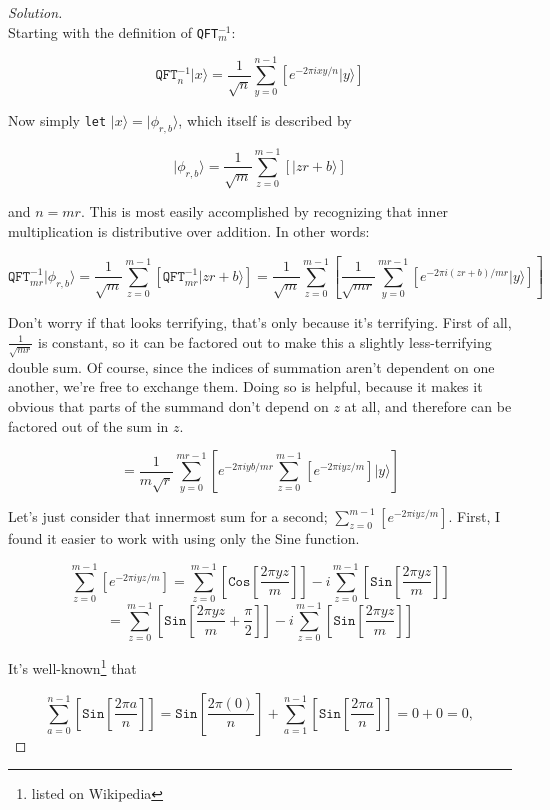 \documentclass[12pt]{article}
\begin{document}
\begin{proof}[Solution]~\\
Starting with the definition of \texttt{QFT}$^{-1}_m$:

$$\texttt{QFT}^{-1}_n|x\rangle=\frac{1}{\sqrt{n}}\sum_{y=0}^{n-1}\left[e^{-2\pi ixy/n}|y\rangle\right]$$

Now simply \texttt{let} $|x\rangle=|\phi_{r,b}\rangle$, which itself is described by

$$|\phi_{r,b}\rangle=\frac{1}{\sqrt{m}}\sum_{z=0}^{m-1}\left[|zr+b\rangle\right]$$

and $n=mr$. This is most easily accomplished by recognizing that inner multiplication is distributive over addition. In other words:

$$\texttt{QFT}_{mr}^{-1}|\phi_{r,b}\rangle=\frac{1}{\sqrt{m}}\sum_{z=0}^{m-1}\left[\texttt{QFT}_{mr}^{-1}|zr+b\rangle\right]=\frac{1}{\sqrt{m}}\sum_{z=0}^{m-1}\left[\frac{1}{\sqrt{mr}}\sum_{y=0}^{mr-1}\left[e^{-2\pi i(zr+b)/mr}|y\rangle\right]\right]$$

Don't worry if that looks terrifying, that's only because it's terrifying. First of all, $\frac{1}{\sqrt{mr}}$ is constant, so it can be factored out to make this a slightly less-terrifying double sum. Of course, since the indices of summation aren't dependent on one another, we're free to exchange them. Doing so is helpful, because it makes it obvious that parts of the summand don't depend on $z$ at all, and therefore can be factored out of the sum in $z$.

$$=\frac{1}{m\sqrt{r}}\sum_{y=0}^{mr-1}\left[e^{-2\pi iyb/mr}\sum_{z=0}^{m-1}\left[e^{-2\pi iyz/m}\right]|y\rangle\right]$$

Let's just consider that innermost sum for a second; $\sum_{z=0}^{m-1}[e^{-2\pi iyz/m}]$. First, I found it easier to work with using only the Sine function.

$$\sum_{z=0}^{m-1}[e^{-2\pi iyz/m}]=\sum_{z=0}^{m-1}\left[\texttt{Cos}\left[\frac{2\pi yz}{m}\right]\right]-i\sum_{z=0}^{m-1}\left[\texttt{Sin}\left[\frac{2\pi yz}{m}\right]\right]$$
$$=\sum_{z=0}^{m-1}\left[\texttt{Sin}\left[\frac{2\pi yz}{m}+\frac{\pi}{2}\right]\right]-i\sum_{z=0}^{m-1}\left[\texttt{Sin}\left[\frac{2\pi yz}{m}\right]\right]$$

\renewcommand*{\thefootnote}{\fnsymbol{footnote}}
\centering It's well-known\footnote{listed on Wikipedia} that 

$$\sum_{a=0}^{n-1}\left[\texttt{Sin}\left[\frac{2\pi a}{n}\right]\right]=\texttt{Sin}\left[\frac{2\pi(0)}{n}\right]+\sum_{a=1}^{n-1}\left[\texttt{Sin}\left[\frac{2\pi a}{n}\right]\right]=0+0=0,$$


\end{proof}
\end{document}
